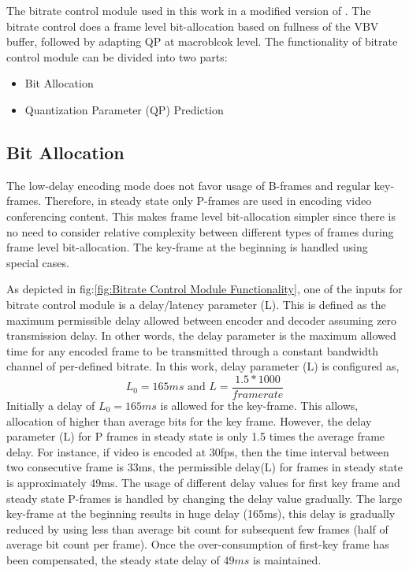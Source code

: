 \documentclass[11pt]{article} %
\begin{document}
 The bitrate control module used in this work in a modified version of \cite{JVTF086}.  The bitrate control does a frame level bit-allocation based on fullness of the VBV buffer, followed by adapting QP at macroblcok level. The functionality of bitrate control module can be divided into two parts:
\begin{itemize}  
\item Bit Allocation
\item Quantization Parameter (QP) Prediction
\end{itemize}

\subsection{Bit Allocation}

The low-delay encoding mode does not favor usage of B-frames and regular key-frames. Therefore, in steady state only P-frames are used in encoding video conferencing content. This makes frame level bit-allocation simpler since there is no need to consider relative complexity between different types of frames during frame level bit-allocation. The key-frame at the beginning is handled using special cases.  

As depicted in fig:\ref{fig:Bitrate Control Module Functionality}, one of the inputs for bitrate control module is a delay/latency parameter (L). This is defined as the maximum permissible delay allowed between encoder and decoder assuming zero transmission delay. In other words, the delay parameter is the maximum allowed time for any encoded frame to be transmitted through a constant bandwidth channel of per-defined bitrate. In this work, delay parameter (L) is configured as, 
$$L_0 = 165 ms \text{	and	} L = \frac{1.5 * 1000}{framerate}$$
Initially a delay of $L_0 = 165ms$ is allowed for the key-frame. This allows, allocation of higher than average bits for the key frame. However, the delay parameter (L) for P frames in steady state is only 1.5 times the average frame delay. For instance, if video is encoded at 30fps, then the time interval between two consecutive frame is 33ms, the permissible delay(L) for frames in steady state is approximately 49ms. The usage of different delay values for first key frame and steady state P-frames is handled by changing the delay value gradually. The large key-frame at the beginning results in huge delay (165ms), this delay is gradually reduced by using less than average bit count for subsequent few frames (half of average bit count per frame). Once the over-consumption of first-key frame has been compensated, the steady state delay of $49ms$ is maintained. 
\end{document}
